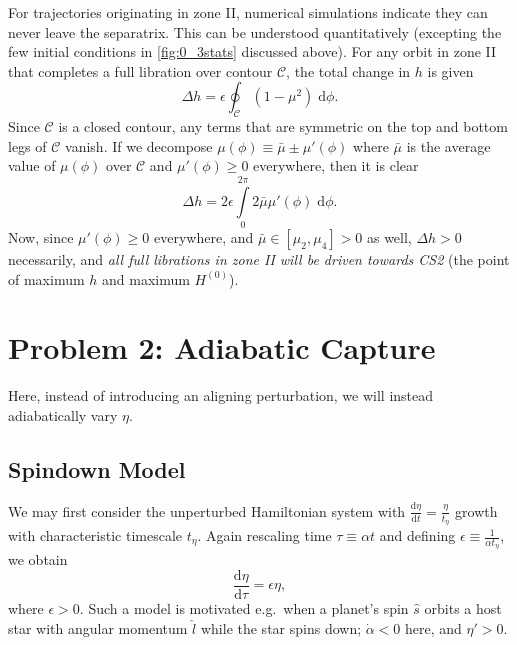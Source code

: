 \documentclass[
        fleqn,
        usenatbib,
    ]{mnras}
\newcommand*{\rd}[2]{\frac{\mathrm{d}#1}{\mathrm{d}#2}}
\begin{document}
For trajectories originating in zone II, numerical simulations indicate they can
never leave the separatrix. This can be understood quantitatively (excepting the
few initial conditions in \autoref{fig:0_3stats} discussed above). For any orbit
in zone II that completes a full libration over contour $\mathcal{C}$, the total
change in $h$ is given
\begin{equation}
    \Delta h = \epsilon \oint_{\mathcal{C}} (1 - \mu^2)\;\mathrm{d}\phi.
\end{equation}
Since $\mathcal{C}$ is a closed contour, any terms that are symmetric on the top
and bottom legs of $\mathcal{C}$ vanish. If we decompose $\mu(\phi) \equiv
\bar{\mu} \pm \mu'(\phi)$ where $\bar{\mu}$ is the average value of $\mu(\phi)$
over $\mathcal{C}$ and $\mu'(\phi) \geq 0$ everywhere, then it is clear
\begin{equation}
    \Delta h = 2\epsilon \int\limits_0^{2\pi} 2\bar{\mu}\mu'(\phi)
            \;\mathrm{d}\phi.
\end{equation}
Now, since $\mu'(\phi) \geq 0$ everywhere, and $\bar{\mu} \in [\mu_2, \mu_4] >
0$ as well, $\Delta h > 0$ necessarily, and \emph{all full librations in zone II
will be driven towards CS2} (the point of maximum $h$ and maximum $H^{(0)}$).

\section{Problem 2: Adiabatic Capture}\label{s:p2}

Here, instead of introducing an aligning perturbation, we will instead
adiabatically vary $\eta$.

\subsection{Spindown Model}\label{ss:p2_spindown}

We may first consider the unperturbed Hamiltonian
system with $\rd{\eta}{t} = \frac{\eta}{t_\eta}$ growth with characteristic
timescale $t_\eta$. Again rescaling time $\tau \equiv \alpha t$ and defining
$\epsilon \equiv \frac{1}{\alpha t_\eta}$, we obtain
\begin{equation}
    \rd{\eta}{\tau} = \epsilon \eta,
\end{equation}
where $\epsilon > 0$. Such a model is motivated e.g.\ when a planet's
spin $\hat{s}$ orbits a host star with angular momentum $\hat{l}$ while the star
spins down; $\dot{\alpha} < 0$ here, and $\eta' > 0$.
\end{document}
